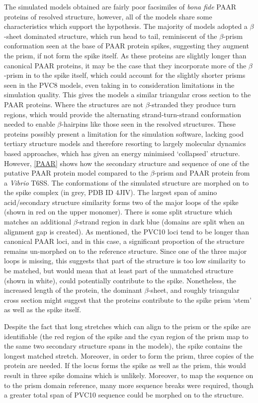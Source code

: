 The simulated models obtained are fairly poor facsimiles of \emph{bona fide} PAAR proteins of resolved structure, however, all of the models share some characteristics which support the hypothesis. The majority of models adopted a $\beta$-sheet dominated structure, which run head to tail, reminiscent of the $\beta$-prism conformation seen at the base of PAAR protein spikes, suggesting they augment the prism, if not form the spike itself. As these proteins are slightly longer than canonical PAAR proteins, it may be the case that they incorporate more of the $\beta$-prism in to the spike itself, which could account for the slightly shorter prisms seen in the PVC8 models, even taking in to consideration limitations in the simulation quality. This gives the models a similar triangular cross section to the PAAR proteins. Where the structures are not $\beta$-stranded they produce turn regions, which would provide the alternating strand-turn-strand conformation needed to enable $\beta$-hairpins like those seen in the resolved structures. These proteins possibly present a limitation for the simulation software, lacking good tertiary structure models and therefore resorting to largely molecular dynamics based approaches, which has given an energy minimised `collapsed' structure. However, \vref{PAAR} shows how the secondary structure and sequence of one of the putative PAAR protein model compared to the $\beta$-prism and PAAR protein from a \emph{Vibrio} T6SS. The conformations of the simulated structure are morphed on to the spike complex (in grey, PDB ID 4JIV). The largest span of amino acid/secondary structure similarity forms two of the major loops of the spike (shown in red on the upper monomer). There is some split structure which matches an additional $\beta$-strand region in dark blue (domains are split when an alignment gap is created). As mentioned, the PVC10 loci tend to be longer than canonical PAAR loci, and in this case, a significant proportion of the structure remains un-morphed on to the reference structure. Since one of the three major loops is missing, this suggests that part of the structure is too low similarity to be matched, but would mean that at least part of the unmatched structure (shown in white), could potentially contribute to the spike. Nonetheless, the increased length of the protein, the dominant $\beta$-sheet, and roughly triangular cross section might suggest that the proteins contribute to the spike prism `stem' as well as the spike itself.

Despite the fact that long stretches which can align to the prism or the spike are identifiable (the red region of the spike and the cyan region of the prism map to the same two secondary structure spans in the models), the spike contains the longest matched stretch. Moreover, in order to form the prism, three copies of the protein are needed. If the locus forms the spike as well as the prism, this would result in three spike domains which is unlikely. Moreover, to map the sequence on to the prism domain reference, many more sequence breaks were required, though a greater total span of PVC10 sequence could be morphed on to the structure.


